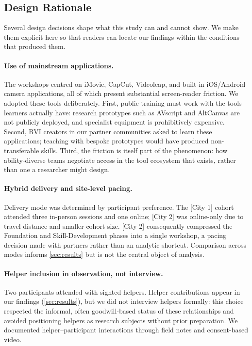 \subsection{Design Rationale}
\label{sec:design-rationale}
Several design decisions shape what this study can and cannot show. We make them explicit here so that readers can locate our findings within the conditions that produced them.

\paragraph{Use of mainstream applications.}
The workshops centred on iMovie, CapCut, Videoleap, and built-in iOS/Android camera applications, all of which present substantial screen-reader friction. We adopted these tools deliberately. First, public training must work with the tools learners actually have: research prototypes such as AVscript and AltCanvas \cite{huh_avscript_2023,lee_altcanvas_2024} are not publicly deployed, and specialist equipment is prohibitively expensive. Second, BVI creators in our partner communities asked to learn these applications; teaching with bespoke prototypes would have produced non-transferable skills. Third, the friction is itself part of the phenomenon: how ability-diverse teams negotiate access in the tool ecosystem that exists, rather than one a researcher might design.

\paragraph{Hybrid delivery and site-level pacing.}
Delivery mode was determined by participant preference. The [City 1] cohort attended three in-person sessions and one online; [City 2] was online-only due to travel distance and smaller cohort size. [City 2] consequently compressed the Foundation and Skill-Development phases into a single workshop, a pacing decision made with partners rather than an analytic shortcut. Comparison across modes informs \autoref{sec:results} but is not the central object of analysis.

\paragraph{Helper inclusion in observation, not interview.}
Two participants attended with sighted helpers. Helper contributions appear in our findings (\autoref{sec:results}), but we did not interview helpers formally: this choice respected the informal, often goodwill-based status of these relationships and avoided positioning helpers as research subjects without prior preparation. We documented helper--participant interactions through field notes and consent-based video.

